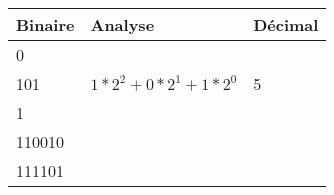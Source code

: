 \begin{tabular}{p{2cm}|p{10cm}|p{2cm}}
Binaire		&Analyse	&Décimal\\
\hline
0		&		&	\\
\hline
101		&$1*2^2 + 0*2^1 + 1*2^0$		&5	\\
\hline
1		&		&	\\
\hline
110010		&		&	\\
\hline
111101		&		&	\\
\end{tabular}
